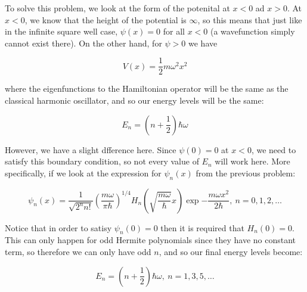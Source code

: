 \documentclass[10pt]{article}
\begin{document}
        \begin{solution}
            To solve this problem, we look at the form of the potenital at $x < 0$ ad $x > 0$. At $x < 0$, we know that the height of the potential is $\infty$, so this means that just like in the infinite square well case, $\psi(x) = 0$ for all $x < 0$ (a wavefunction simply cannot exist there). On the other hand, for $\psi > 0$ we have

            \[ V(x) = \frac{1}{2} m\omega^2x^2\]

            where the eigenfunctions to the Hamiltonian operator will be the same as the classical harmonic oscillator, and so our energy levels will be the same:

            \[ E_n = \left(n + \frac{1}{2}\right)\hbar \omega\]

            However, we have a slight dfference here. Since $\psi(0) = 0$ at $x < 0$, we need to satisfy this boundary condition, so not every value of $E_n$ will work here. More specifically, if we look at the expression for $\psi_n(x)$ from the previous problem: 

            \[ \psi_n(x) = \frac{1}{\sqrt{2^n n!}}\left(\frac{m\omega}{\pi \hbar}\right)^{1/4} H_n\left(\sqrt{\frac{m\omega}{\hbar}} x\right) \exp{-\frac{m\omega x^2}{2\hbar}}, \ n = 0, 1, 2, \dots\]

            Notice that in order to satisy $\psi_n(0) = 0$ then it is required that $H_n(0) = 0$. This can only happen for odd Hermite polynomials since they have no constant term, so therefore we can only have odd $n$, and so our final energy levels become:

            \[ E_n = \left(n + \frac{1}{2}\right) \hbar \omega, \ n = 1, 3, 5, \dots\]



            
            

            
            
        \end{solution}
\end{document}
